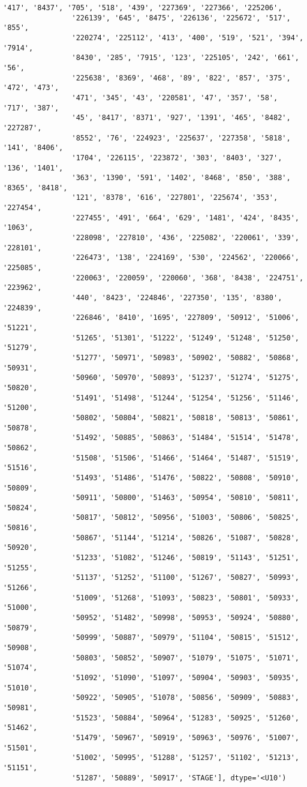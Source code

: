 \documentclass[11pt]{article}
\begin{document}
\begin{Verbatim}[commandchars=\\\{\}]
                '417', '8437', '705', '518', '439', '227369', '227366', '225206',
                '226139', '645', '8475', '226136', '225672', '517', '855',
                '220274', '225112', '413', '400', '519', '521', '394', '7914',
                '8430', '285', '7915', '123', '225105', '242', '661', '56',
                '225638', '8369', '468', '89', '822', '857', '375', '472', '473',
                '471', '345', '43', '220581', '47', '357', '58', '717', '387',
                '45', '8417', '8371', '927', '1391', '465', '8482', '227287',
                '8552', '76', '224923', '225637', '227358', '5818', '141', '8406',
                '1704', '226115', '223872', '303', '8403', '327', '136', '1401',
                '363', '1390', '591', '1402', '8468', '850', '388', '8365', '8418',
                '121', '8378', '616', '227801', '225674', '353', '227454',
                '227455', '491', '664', '629', '1481', '424', '8435', '1063',
                '228098', '227810', '436', '225082', '220061', '339', '228101',
                '226473', '138', '224169', '530', '224562', '220066', '225085',
                '220063', '220059', '220060', '368', '8438', '224751', '223962',
                '440', '8423', '224846', '227350', '135', '8380', '224839',
                '226846', '8410', '1695', '227809', '50912', '51006', '51221',
                '51265', '51301', '51222', '51249', '51248', '51250', '51279',
                '51277', '50971', '50983', '50902', '50882', '50868', '50931',
                '50960', '50970', '50893', '51237', '51274', '51275', '50820',
                '51491', '51498', '51244', '51254', '51256', '51146', '51200',
                '50802', '50804', '50821', '50818', '50813', '50861', '50878',
                '51492', '50885', '50863', '51484', '51514', '51478', '50862',
                '51508', '51506', '51466', '51464', '51487', '51519', '51516',
                '51493', '51486', '51476', '50822', '50808', '50910', '50809',
                '50911', '50800', '51463', '50954', '50810', '50811', '50824',
                '50817', '50812', '50956', '51003', '50806', '50825', '50816',
                '50867', '51144', '51214', '50826', '51087', '50828', '50920',
                '51233', '51082', '51246', '50819', '51143', '51251', '51255',
                '51137', '51252', '51100', '51267', '50827', '50993', '51266',
                '51009', '51268', '51093', '50823', '50801', '50933', '51000',
                '50952', '51482', '50998', '50953', '50924', '50880', '50879',
                '50999', '50887', '50979', '51104', '50815', '51512', '50908',
                '50803', '50852', '50907', '51079', '51075', '51071', '51074',
                '51092', '51090', '51097', '50904', '50903', '50935', '51010',
                '50922', '50905', '51078', '50856', '50909', '50883', '50981',
                '51523', '50884', '50964', '51283', '50925', '51260', '51462',
                '51479', '50967', '50919', '50963', '50976', '51007', '51501',
                '51002', '50995', '51288', '51257', '51102', '51213', '51151',
                '51287', '50889', '50917', 'STAGE'], dtype='<U10')
\end{Verbatim}
            
\end{document}
